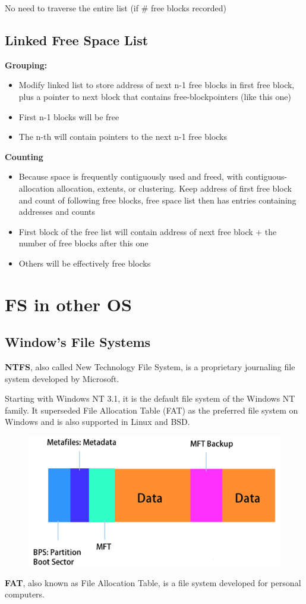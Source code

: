 No need to traverse the entire list (if \#
free blocks recorded)

\subsection{Linked Free Space List}

\textbf{Grouping:}

\begin{itemize}
    \item Modify linked list to store address of next n-1 free blocks in first free block, plus a pointer to next block that contains free-blockpointers (like this one)
    \item First n-1 blocks will be free
    \item The n-th will contain pointers to the next n-1 free blocks
\end{itemize}

\textbf{Counting}

\begin{itemize}
    \item Because space is frequently contiguously used and freed, with contiguous-allocation allocation, extents, or clustering. Keep address of first free block and count of following free blocks, free space list then has entries containing addresses and counts
    \item First block of the free list will contain address of next free block + the number of free blocks after this one
    \item Others will be effectively free blocks
\end{itemize}

\section{FS in other OS}

\subsection{Window’s File Systems}

\textbf{NTFS}, also called New Technology File System, is a proprietary journaling file
system developed by Microsoft. 

Starting with Windows NT 3.1, it is the default file system of the Windows
NT family. It superseded File Allocation Table (FAT) as the preferred file
system on Windows and is also supported in Linux and BSD.


\begin{figure}[h!]
    \centering
    \includegraphics[width=0.5\linewidth]{img/dnfga.png}
\end{figure}
\newpage
\textbf{FAT}, also known as File Allocation Table, is a file system developed for
personal computers.


